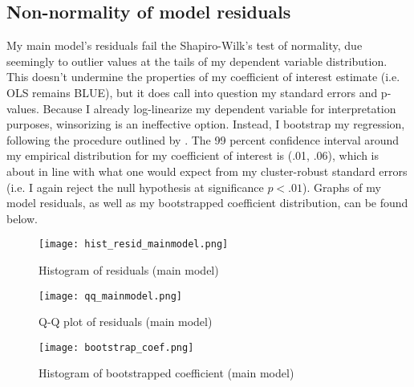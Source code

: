 \documentclass[12pt,letterpaper]{article}
\begin{document}
\subsection{Non-normality of model residuals}
My main model's residuals fail the Shapiro-Wilk's test of normality, due seemingly to outlier values at the tails of my dependent variable distribution. This doesn't undermine the properties of my coefficient of interest estimate (i.e. OLS remains BLUE), but it does call into question my standard errors and p-values. Because I already log-linearize my dependent variable for interpretation purposes, winsorizing is an ineffective option. Instead, I bootstrap my regression, following the procedure outlined by \citet{fox_bootstrapping_2017}. The 99 percent confidence interval around my empirical distribution for my coefficient of interest is (.01, .06), which is about in line with what one would expect from my cluster-robust standard errors (i.e. I again reject the null hypothesis at significance $p<.01$). Graphs of my model residuals, as well as my bootstrapped coefficient distribution, can be found below.
\vspace{1cm}
\begin{figure}[!h]
\begin{center}
\caption{Histogram of residuals (main model)}
\texttt{[image: hist\_resid\_mainmodel.png]}
\end{center}
\end{figure}
\begin{figure}[!h]
\begin{center}
\caption{Q-Q plot of residuals (main model)}
\texttt{[image: qq\_mainmodel.png]}
\end{center}
\end{figure}
\begin{figure}[!h]
\begin{center}
\caption{Histogram of bootstrapped coefficient (main model)}
\texttt{[image: bootstrap\_coef.png]}
\end{center}
\end{figure}
\end{document}
